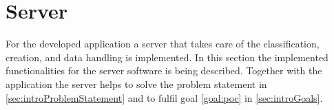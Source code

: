 \section{Server}\label{sec:implServer}
For the developed application a server that takes care of the classification, creation, and data handling is implemented.
In this section the implemented functionalities for the server software is being described.
Together with the application the server helps to solve the problem statement in \cref{sec:introProblemStatement} and to fulfil goal \ref{goal:poc} in \cref{sec:introGoals}.





